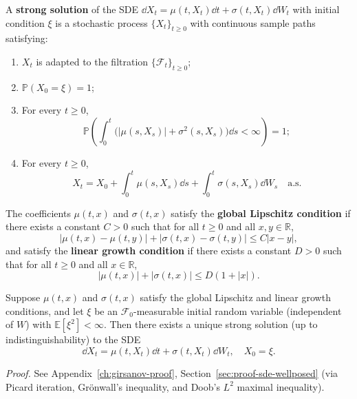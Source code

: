 \begin{definition}
\label{def:strong-solution}
A \textbf{strong solution} of the SDE $\dd X_t = \mu(t, X_t)\dd t + \sigma(t, X_t)\dd W_t$ with initial condition $\xi$ is a stochastic process $\{X_t\}_{t \ge 0}$ with continuous sample paths satisfying:
\begin{enumerate}
    \item $X_t$ is adapted to the filtration $\{\mathcal{F}_t\}_{t \ge 0}$;
    \item $\mathbb{P}(X_0 = \xi) = 1$;
    \item For every $t \ge 0$,
    \[
    \mathbb{P}\left(\int_0^t \big(|\mu(s, X_s)| + \sigma^2(s, X_s)\big)\dd s < \infty\right) = 1;
    \]
    \item For every $t \ge 0$,
    \[
    X_t = X_0 + \int_0^t \mu(s, X_s)\dd s + \int_0^t \sigma(s, X_s)\dd W_s \quad \text{a.s.}
    \]
\end{enumerate}
\end{definition}

The coefficients $\mu(t, x)$ and $\sigma(t, x)$ satisfy the \textbf{global Lipschitz condition} if there exists a constant $C > 0$ such that for all $t \ge 0$ and all $x, y \in \mathbb{R}$,
\[
|\mu(t, x) - \mu(t, y)| + |\sigma(t, x) - \sigma(t, y)| \le C |x - y|,
\]
and satisfy the \textbf{linear growth condition} if there exists a constant $D > 0$ such that for all $t \ge 0$ and all $x \in \mathbb{R}$,
\[
|\mu(t, x)| + |\sigma(t, x)| \le D(1 + |x|).
\]

\begin{theorem}
\label{thm:sde-existence-uniqueness}
Suppose $\mu(t, x)$ and $\sigma(t, x)$ satisfy the global Lipschitz and linear growth conditions, and let $\xi$ be an $\mathcal{F}_0$-measurable initial random variable (independent of $W$) with $\mathbb{E}[\xi^2] < \infty$. Then there exists a unique strong solution (up to indistinguishability) to the SDE
\[
\dd X_t = \mu(t, X_t)\dd t + \sigma(t, X_t)\dd W_t, \quad X_0 = \xi.
\]
\end{theorem}
\noindent\emph{Proof.} See Appendix~\ref{ch:girsanov-proof}, Section~\ref{sec:proof-sde-wellposed} (via Picard iteration, Gr\"onwall's inequality, and Doob's $L^2$ maximal inequality).

